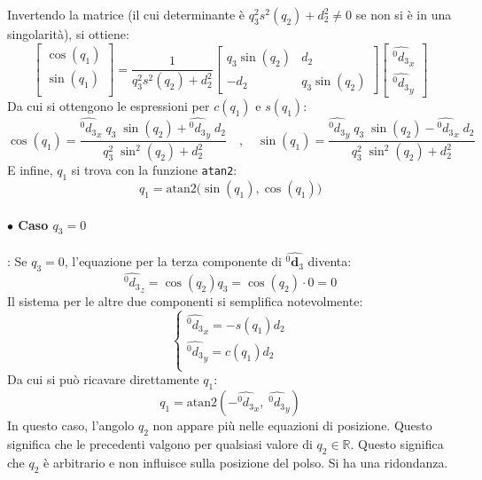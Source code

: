 \documentclass[11pt, a4paper]{report}
\begin{document}
Invertendo la matrice (il cui determinante è \(q_{3}^{2}s^{2}(q_{2}) + d_{2}^{2} \ne 0\) se non si è in una singolarità), si ottiene:
\[
    \begin{bmatrix}
        \cos(q_{1})\\
        \sin(q_{1})\\
    \end{bmatrix}
    =
    \frac{1}{q_{3}^{2}s^{2}(q_{2}) + d_{2}^{2}}
    \begin{bmatrix}
        q_{3}\sin(q_{2}) & d_{2}\\
        -d_{2} & q_{3}\sin(q_{2})
    \end{bmatrix}
    \begin{bmatrix}
        \hat{^{0}d_{3}}_{x}\\
        \hat{^{0}d_{3}}_{y}
    \end{bmatrix}
\]
Da cui si ottengono le espressioni per \(c(q_1)\) e \(s(q_1)\):
\[
    \cos(q_1) = \frac{\hat{^{0}d_{3}}_{x} \; q_3 \; \sin(q_2) + \hat{^{0}d_{3}}_{y} \; d_2}{q_3^2 \; \sin^2(q_2) + d_2^2}
    \quad , \quad
    \sin(q_1) = \frac{\hat{^{0}d_{3}}_{y} \; q_3 \; \sin(q_2) - \hat{^{0}d_{3}}_{x} \; d_2}{q_3^2 \; \sin^2(q_2) + d_2^2}
\]
E infine, \(q_1\) si trova con la funzione \texttt{atan2}:
\[
    \boxed{
        q_{1} = \text{atan2} \biggl( \sin(q_{1}), \cos(q_{1}) \biggr)
    }
\]

\paragraph{\(\bullet\) Caso \(q_{3} = 0\)}:
Se \(q_3=0\), l'equazione per la terza componente di \(\hat{^{0}\mathbf{d}_{3}}\) diventa:
\[
    \hat{^{0}d_{3}}_{z} = \cos(q_{2})q_{3} = \cos(q_{2}) \cdot 0 = 0
\]
Il sistema per le altre due componenti si semplifica notevolmente:
\[
    \begin{cases}
        \hat{^{0}d_{3}}_{x} = -s(q_{1})d_{2}\\
        \hat{^{0}d_{3}}_{y} = c(q_{1})d_{2}\\
    \end{cases}
\]
Da cui si può ricavare direttamente \(q_1\):
\[
    \boxed{q_{1} = \text{atan2}( -\hat{^{0}d_{3}}_{x}, \;\hat{^{0}d_{3}}_{y} )}
\]
In questo caso, l'angolo \(q_2\) non appare più nelle equazioni di posizione. Questo significa che le precedenti valgono per qualsiasi valore di \(q_2 \in \mathbb{R}\). Questo significa che \(q_2\) è arbitrario e non influisce sulla posizione del polso. Si ha una ridondanza.
\end{document}
